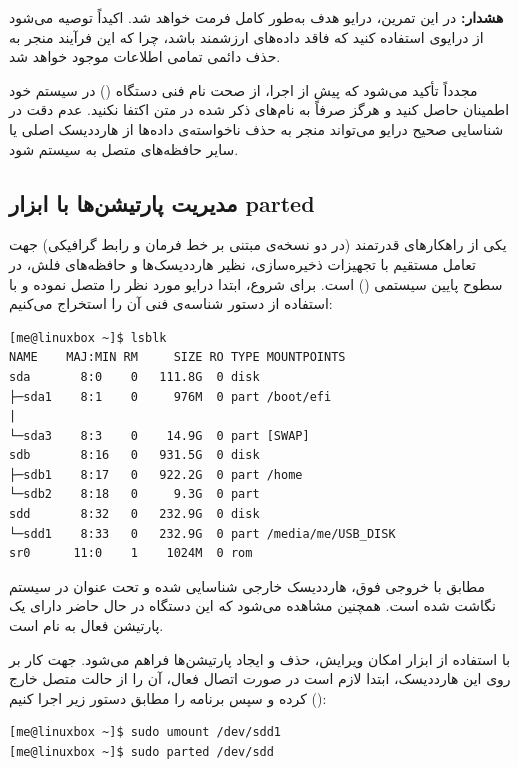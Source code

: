 \begin{warning}
\textbf{هشدار:} در این تمرین، درایو هدف به‌طور کامل فرمت خواهد شد. اکیداً توصیه می‌شود از درایوی استفاده کنید که فاقد داده‌های ارزشمند باشد، چرا که این فرآیند منجر به حذف دائمی تمامی اطلاعات موجود خواهد شد.
\end{warning}

مجدداً تأکید می‌شود که پیش از اجرا، از صحت نام فنی دستگاه () در سیستم خود اطمینان حاصل کنید و هرگز صرفاً به نام‌های ذکر شده در متن اکتفا نکنید. عدم دقت در شناسایی صحیح درایو می‌تواند منجر به حذف ناخواسته‌ی داده‌ها از هارددیسک اصلی یا سایر حافظه‌های متصل به سیستم شود.

\subsection{مدیریت پارتیشن‌ها با ابزار parted}

 یکی از راهکارهای قدرتمند (در دو نسخه‌ی مبتنی بر خط فرمان و رابط گرافیکی) جهت تعامل مستقیم با تجهیزات ذخیره‌سازی، نظیر هارددیسک‌ها و حافظه‌های فلش، در سطوح پایین سیستمی () است. برای شروع، ابتدا درایو مورد نظر را متصل نموده و با استفاده از دستور  شناسه‌ی فنی آن را استخراج می‌کنیم:

\begin{latin}
\begin{lstlisting}
[me@linuxbox ~]$ lsblk
NAME    MAJ:MIN RM     SIZE RO TYPE MOUNTPOINTS
sda       8:0    0   111.8G  0 disk
├─sda1    8:1    0     976M  0 part /boot/efi
|
└─sda3    8:3    0    14.9G  0 part [SWAP]
sdb       8:16   0   931.5G  0 disk
├─sdb1    8:17   0   922.2G  0 part /home
└─sdb2    8:18   0     9.3G  0 part
sdd       8:32   0   232.9G  0 disk
└─sdd1    8:33   0   232.9G  0 part /media/me/USB_DISK
sr0      11:0    1    1024M  0 rom
\end{lstlisting}
\end{latin}

مطابق با خروجی فوق، هارددیسک خارجی شناسایی شده و تحت عنوان  در سیستم نگاشت شده است. همچنین مشاهده می‌شود که این دستگاه در حال حاضر دارای یک پارتیشن فعال به نام  است.

با استفاده از ابزار  امکان ویرایش، حذف و ایجاد پارتیشن‌ها فراهم می‌شود. جهت کار بر روی این هارددیسک، ابتدا لازم است در صورت اتصال فعال، آن را از حالت متصل خارج () کرده و سپس برنامه را مطابق دستور زیر اجرا کنیم:

\begin{latin}
\begin{lstlisting}
[me@linuxbox ~]$ sudo umount /dev/sdd1
[me@linuxbox ~]$ sudo parted /dev/sdd
\end{lstlisting}
\end{latin}


